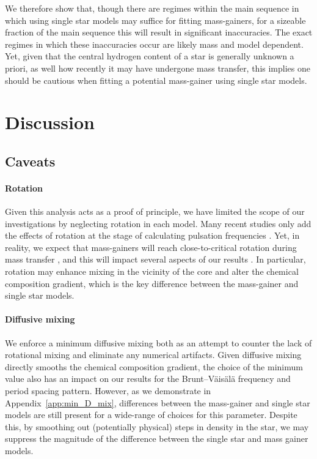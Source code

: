 \documentclass[twocolumn, twocolappendix, oneside]{aastex631}
\newcommand{\bvf}{Brunt–Väisälä frequency\xspace}
\begin{document}
We therefore show that, though there are regimes within the main sequence in which using single star models may suffice for fitting mass-gainers, for a sizeable fraction of the main sequence this will result in significant inaccuracies. The exact regimes in which these inaccuracies occur are likely mass and model dependent. Yet, given that the central hydrogen content of a star is generally unknown a priori, as well how recently it may have undergone mass transfer, this implies one should be cautious when fitting a potential mass-gainer using single star models.

\section{Discussion}

\subsection{Caveats}\label{sec:caveats}
\paragraph{Rotation} Given this analysis acts as a proof of principle, we have limited the scope of our investigations by neglecting rotation in each model. Many recent studies only add the effects of rotation at the stage of calculating pulsation frequencies \citep[e.g.][]{Michielsen+2021}. Yet, in reality, we expect that mass-gainers will reach close-to-critical rotation during mass transfer \citep{Packet+1981, Paczynski+1991, Popham+1991, Renzo+2021}, and this will impact several aspects of our results \citep[e.g.][and references therein]{Aerts+2023:2023arXiv231108453A}. In particular, rotation may enhance mixing in the vicinity of the core and alter the chemical composition gradient, which is the key difference between the mass-gainer and single star models.

\paragraph{Diffusive mixing} We enforce a minimum diffusive mixing both as an attempt to counter the lack of rotational mixing and eliminate any numerical artifacts. Given diffusive mixing directly smooths the chemical composition gradient, the choice of the minimum value also has an impact on our results for the \bvf and period spacing pattern. However, as we demonstrate in Appendix~\ref{app:min_D_mix}, differences between the mass-gainer and single star models are still present for a wide-range of choices for this parameter. Despite this, by smoothing out (potentially physical) steps in density in the star, we may suppress the magnitude of the difference between the single star and mass gainer models.
\end{document}
